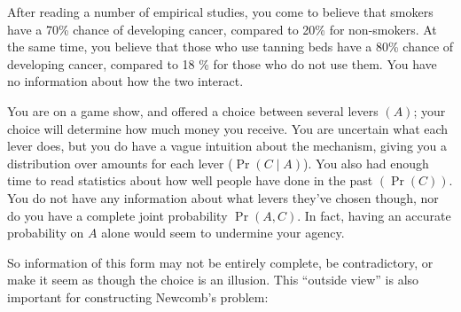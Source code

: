 \documentclass{article}
\begin{document}
	\begin{example}
		After reading a number of empirical studies, you come to believe that smokers have a 70\% chance of developing cancer, compared to 20\% for non-smokers. At the same time, you believe that those who use tanning beds have a 80\% chance of developing cancer, compared to 18 \% for those who do not use them. You have no information about how the two interact.
	\end{example}
	
	\begin{example}
		You are on a game show, and offered a choice between several levers $(A)$; your choice will determine how much money you receive. You are uncertain what each lever does, but you do have a vague intuition about the mechanism, giving you a distribution over amounts for each lever ($\Pr(C \mid A)$). You also had enough time to read statistics about how well people have done in the past $(\Pr(C))$. You do not have any information about what levers they've chosen though, nor do you have a complete joint probability $\Pr(A, C)$. In fact, having an accurate probability on $A$ alone would seem to undermine your agency.
	\end{example}


	So information of this form may not be entirely complete, be contradictory, or make it seem as though the choice is an illusion. This ``outside view'' is also important for constructing Newcomb's problem:
	
\end{document}
